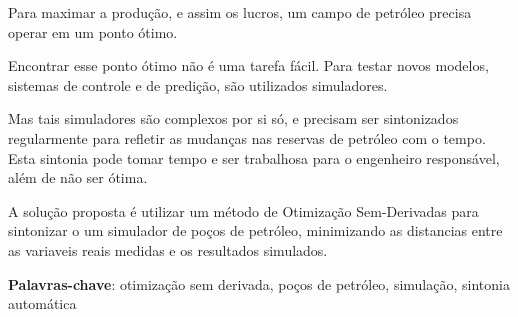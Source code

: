 
\setlength{\absparsep}{18pt} %
\begin{resumo}

Para maximar a produção, e assim os lucros, um campo de petróleo precisa operar em um ponto ótimo.

Encontrar esse ponto ótimo não é uma tarefa fácil. Para testar novos modelos, sistemas de controle e de predição, são utilizados simuladores.

Mas tais simuladores são complexos por si só, e precisam ser sintonizados regularmente para refletir as mudanças nas reservas de petróleo com o tempo. Esta sintonia pode tomar tempo e ser trabalhosa para o engenheiro responsável, além de não ser ótima.

A solução proposta é utilizar um método de Otimização Sem-Derivadas para sintonizar o um simulador de poços de petróleo, minimizando as distancias entre as variaveis reais medidas e os resultados simulados.

 \textbf{Palavras-chave}: otimização sem derivada, poços de petróleo, simulação, sintonia automática 
\end{resumo}

